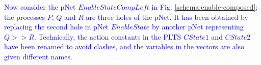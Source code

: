 \documentclass[smallcondensed]{svjour3}
\newcommand{\ERIC}[1]{\textcolor{blue}{#1}}
\newcommand{\QIN}[1]{\textcolor{airforceblue}{#1}}
\begin{document}
\begin{example}\label{example:pNetComposeEnable}
\ERIC{
  Now consider the pNet $EnableStateCompLeft$ in Fig. \ref{schema:enable-composed}; the processes $P$, $Q$ and $R$ are three holes of the pNet.
It has been obtained by replacing the second hole in pNet $EnableState$ by another pNet representing $Q>>R$. Technically, the action constants in the PLTS $CState1$ and $CState2$ have been renamed to avoid clashes, and the variables in the vectors are also given different names.
}
\end{example}


\end{document}
